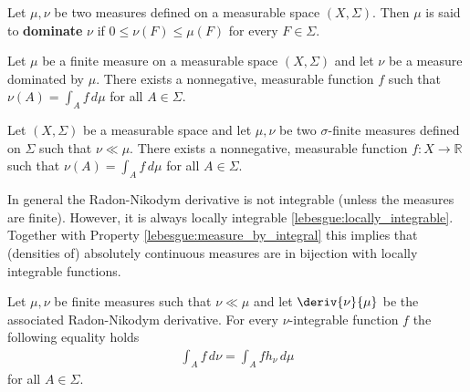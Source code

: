     \begin{definition}
        Let $\mu,\nu$ be two measures defined on a measurable space $(X,\Sigma)$. Then $\mu$ is said to \textbf{dominate} $\nu$ if $0\leq\nu(F)\leq\mu(F)$ for every $F\in\Sigma$.
    \end{definition}

    \begin{theorem}
        Let $\mu$ be a finite measure on a measurable space $(X,\Sigma)$ and let $\nu$ be a measure dominated by $\mu$. There exists a nonnegative, measurable function $f$ such that $\nu(A) = \int_Af\,d\mu$ for all $A\in\Sigma$.
    \end{theorem}

    \begin{theorem}
        Let $(X,\Sigma)$ be a measurable space and let $\mu,\nu$ be two $\sigma$-finite measures defined on $\Sigma$ such that $\nu\ll\mu$. There exists a nonnegative, measurable function $f:X\rightarrow\mathbb{R}$ such that $\nu(A) = \int_Af\,d\mu$ for all $A\in\Sigma$.
    \end{theorem}
    \begin{property}
        In general the Radon-Nikodym derivative is not integrable (unless the measures are finite). However, it is always locally integrable \ref{lebesgue:locally_integrable}. Together with Property \ref{lebesgue:measure_by_integral} this implies that (densities of) absolutely continuous measures are in bijection with locally integrable functions.
    \end{property}

    \begin{property}
        Let $\mu,\nu$ be finite measures such that $\nu\ll\mu$ and let $\deriv{\nu}{\mu}$ be the associated Radon-Nikodym derivative. For every $\nu$-integrable function $f$ the following equality holds
        \begin{gather}
            \int_A f\,d\nu = \int_Afh_\nu\,d\mu
        \end{gather}
        for all $A\in\Sigma$.
    \end{property}


